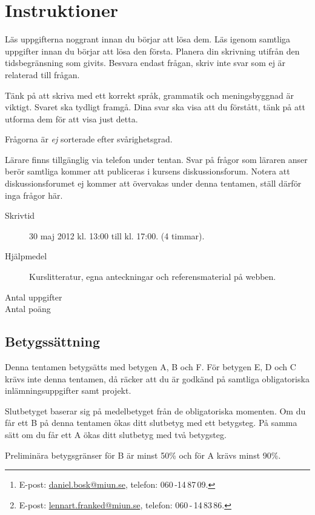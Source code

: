\documentclass[a4paper,11pt,addpoints]{miunexam}
\author{%
	Daniel Bosk\footnote{%
		E-post: \protect\url{daniel.bosk@miun.se},
		telefon: 060\,-14\,87\,09.
	} och
	Lennart Franked\footnote{%
		E-post: \protect\url{lennart.franked@miun.se},
		telefon: 060\,-\,14\,83\,86.
	}
}
\date{2012-05-30}
\begin{document}
\maketitle
\thispagestyle{foot}

\section*{Instruktioner}
\noindent
Läs uppgifterna noggrant innan du börjar att lösa dem.
Läs igenom samtliga uppgifter innan du börjar att lösa den första.
Planera din skrivning utifrån den tidsbegränsning som givits.
Besvara endast frågan, skriv inte svar som ej är relaterad till frågan.

Tänk på att skriva med ett korrekt språk, grammatik och meningsbyggnad är 
viktigt.
Svaret ska tydligt framgå.
Dina svar ska visa att du förstått, tänk på att utforma dem för att visa just 
detta.

Frågorna är \emph{ej} sorterade efter svårighetsgrad.

Lärare finns tillgänglig via telefon under tentan.
Svar på frågor som läraren anser berör samtliga kommer att publiceras i kursens
diskussionsforum.
Notera att diskussionsforumet ej kommer att övervakas under denna tentamen, 
ställ därför inga frågor här.

\begin{description}
	\item[Skrivtid] 30 maj 2012 kl. 13:00 till kl. 17:00.
		(4 timmar).
	\item[Hjälpmedel] Kurslitteratur, egna anteckningar och referensmaterial på
		webben.
	\item[Antal uppgifter] \numquestions
	\item[Antal poäng] \numpoints
\end{description}


\subsection*{Betygssättning}
\noindent
Denna tentamen betygsätts med betygen A, B och F.
För betygen E, D och C krävs inte denna tentamen, då räcker att du är godkänd 
på samtliga obligatoriska inlämningsuppgifter samt projekt.

Slutbetyget baserar sig på medelbetyget från de obligatoriska momenten.
Om du får ett B på denna tentamen ökas ditt slutbetyg med ett betygsteg.
På samma sätt om du får ett A ökas ditt slutbetyg med två betygsteg.

Preliminära betygsgränser för B är minst \unit{50}{\%} och för A krävs minst 
\unit{90}{\%}.
\end{document}
